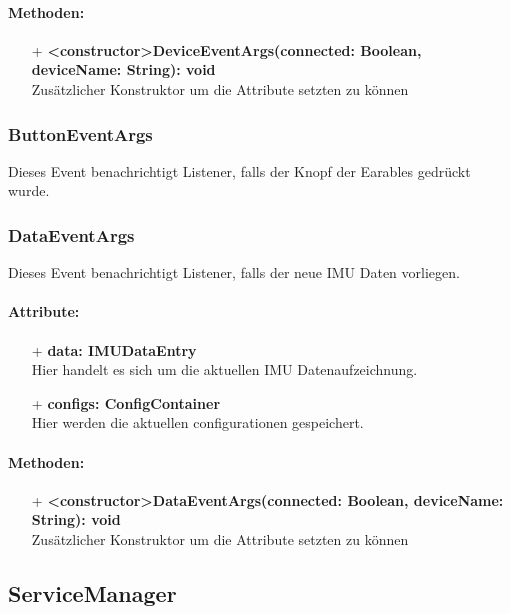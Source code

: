 \documentclass[a4paper,12pt]{article}
\begin{document}
\paragraph{Methoden:}
\begin{itemize}
	\item[+] \textbf{<constructor>DeviceEventArgs(connected: Boolean, deviceName: String): void}\\Zusätzlicher Konstruktor um die Attribute setzten zu können
\end{itemize}


\subsubsection{ButtonEventArgs}
Dieses Event benachrichtigt Listener, falls der Knopf der Earables gedrückt wurde.


\subsubsection{DataEventArgs}
Dieses Event benachrichtigt Listener, falls der neue IMU Daten vorliegen.

\paragraph{Attribute:}
\begin{itemize}
	\item[+] \textbf{data: IMUDataEntry}\\Hier handelt es sich um die aktuellen IMU Datenaufzeichnung.
	\item[+] \textbf{configs: ConfigContainer}\\Hier werden die aktuellen configurationen gespeichert.
\end{itemize}

\paragraph{Methoden:}
\begin{itemize}
	\item[+] \textbf{<constructor>DataEventArgs(connected: Boolean, deviceName: String): void}\\Zusätzlicher Konstruktor um die Attribute setzten zu können
\end{itemize}


\subsection{ServiceManager}
\end{document}
